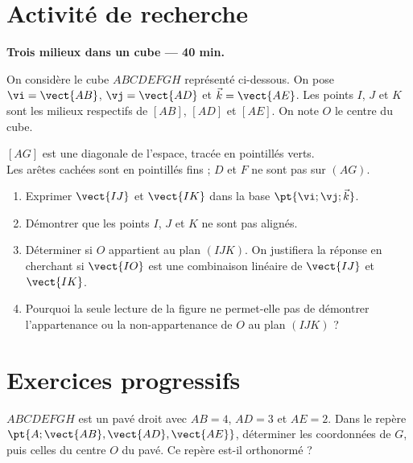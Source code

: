 \section{Activité de recherche}\textbf{Trois milieux dans un cube --- 40 min.}\par On considère le cube $ABCDEFGH$ représenté ci-dessous. On pose $\vi=\vect{AB}$, $\vj=\vect{AD}$ et $\vec k=\vect{AE}$. Les points $I$, $J$ et $K$ sont les milieux respectifs de $[AB]$, $[AD]$ et $[AE]$. On note $O$ le centre du cube.
\begin{center}\par\small $[AG]$ est une diagonale de l'espace, tracée en pointillés verts.\\Les arêtes cachées sont en pointillés fins ; $D$ et $F$ ne sont pas sur $(AG)$.\end{center}
\begin{enumerate}\item Exprimer $\vect{IJ}$ et $\vect{IK}$ dans la base $\pt{\vi;\vj;\vec k}$.
\item Démontrer que les points $I$, $J$ et $K$ ne sont pas alignés.
\item Déterminer si $O$ appartient au plan $(IJK)$. On justifiera la réponse en cherchant si $\vect{IO}$ est une combinaison linéaire de $\vect{IJ}$ et $\vect{IK}$.
\item Pourquoi la seule lecture de la figure ne permet-elle pas de démontrer l'appartenance ou la non-appartenance de $O$ au plan $(IJK)$ ?\end{enumerate}

\mxnewpage
\section{Exercices progressifs}

$ABCDEFGH$ est un pavé droit avec $AB=4$, $AD=3$ et $AE=2$. Dans le repère $\pt{A;\vect{AB},\vect{AD},\vect{AE}}$, déterminer les coordonnées de $G$, puis celles du centre $O$ du pavé. Ce repère est-il orthonormé ?


